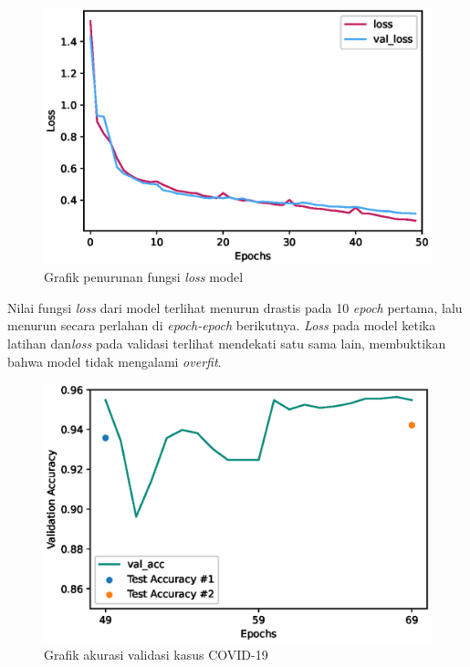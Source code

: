 \documentclass{article}
\begin{document}
   			\begin{figure}[H]
   				\centering
   				\includegraphics[scale=1]{analisis model/final_loss.eps}
   				\caption{Grafik penurunan fungsi \textit{loss} model}
   			\end{figure}
   			
   			\par Nilai fungsi \textit{loss} dari model terlihat menurun drastis pada 10 \textit{epoch} pertama, lalu menurun secara perlahan di \textit{epoch-epoch} berikutnya. \textit{Loss} pada model ketika latihan dan\textit{loss} pada validasi terlihat mendekati satu sama lain, membuktikan bahwa model tidak mengalami \textit{overfit}.
   			
   			\begin{figure}[H]
   				\centering
   				\includegraphics[scale=1]{analisis model/covid_learn_acc.eps}
   				\caption{Grafik akurasi validasi kasus COVID-19}
   			\end{figure}
   			
\end{document}
